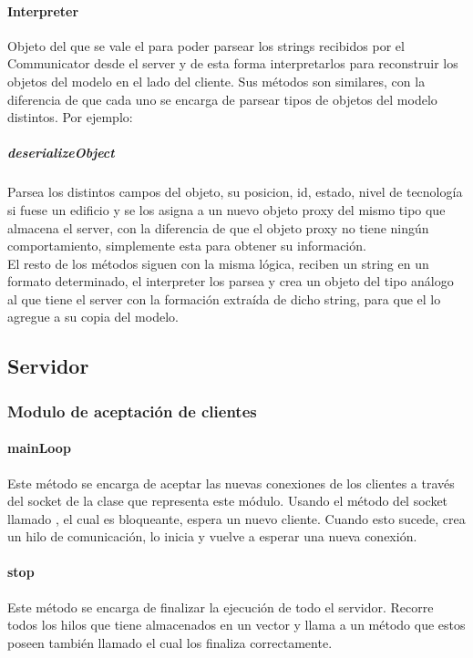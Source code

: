         \paragraph{Interpreter}
            Objeto del que se vale el  para poder parsear
            los strings recibidos por el Communicator desde el server y de
            esta forma interpretarlos para reconstruir los objetos del modelo en
            el lado del cliente. Sus métodos son similares, con la diferencia de
            que cada uno se encarga de parsear tipos de objetos del modelo
            distintos. Por ejemplo:
            \subparagraph{deserializeObject}
                Parsea los distintos campos del objeto, su posicion, id, estado,
                nivel de tecnología si fuese un edificio y se los asigna a un
                nuevo objeto proxy del mismo tipo que almacena el server, con la
                diferencia de que el objeto proxy no tiene ningún comportamiento,
                simplemente esta para obtener su información.\\
                El resto de los métodos siguen con la misma lógica, reciben un
                string en un formato determinado, el interpreter los parsea y
                crea un objeto del tipo análogo al que tiene el server con la
                formación extraída de dicho string, para que el 
                lo agregue a su copia del modelo.
\subsection{Servidor}
    \subsubsection{Modulo de aceptación de clientes}
        \paragraph{mainLoop}
            Este método se encarga de aceptar las nuevas conexiones de los
            clientes a través del socket de la clase que representa este módulo.
            Usando el método del socket llamado , el cual es
            bloqueante, espera un nuevo cliente. Cuando esto sucede, crea un
            hilo de comunicación, lo inicia y vuelve a esperar una
            nueva conexión.
        \paragraph{stop}
            Este método se encarga de finalizar la ejecución de todo el servidor.
            Recorre todos los hilos  que tiene
            almacenados en un vector y llama a un método que estos poseen
            también llamado  el cual los finaliza correctamente.
